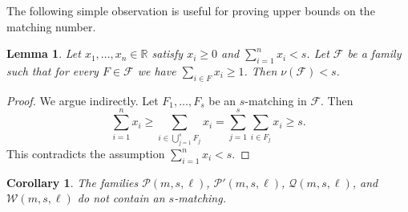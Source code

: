 \documentclass[12pt,a4paper]{article}
\newtheorem{corollary}{Corollary}
\newtheorem{lemma}{Lemma}
\begin{document}
The following simple observation is useful for proving upper bounds on the matching number.

\begin{lemma} \label{l.weak_duality}
    Let $x_1, \ldots, x_n\in \mathbb R$ satisfy $x_i \geq 0$ and $\sum_{i=1}^{n}x_i < s$. Let $\mathcal{F}$ be a family such that for every $F \in \mathcal{F}$ we have $\sum_{i\in F}x_i \geq 1$. Then $\nu(\mathcal{F}) < s$.
\end{lemma}

\begin{proof}
    We argue indirectly. Let $F_1, \ldots, F_s$ be an $s$-matching in $\mathcal{F}$. Then
    \[
    \sum_{i=1}^{n}x_i \geq \sum_{i\in \bigcup_{j = 1}^s F_j}x_i = \sum_{j=1}^{s}\sum_{i\in F_j}x_i \geq s.
    \]
    This contradicts the assumption $\sum_{i=1}^{n}x_i < s$.
\end{proof}

\begin{corollary}
    The families $\mathcal{P}(m, s, \ell)$, $\mathcal{P'}(m, s, \ell)$, $\mathcal{Q}(m, s, \ell)$, and $\mathcal{W}(m, s, \ell)$ do not contain an $s$-matching.
\end{corollary}
\end{document}
